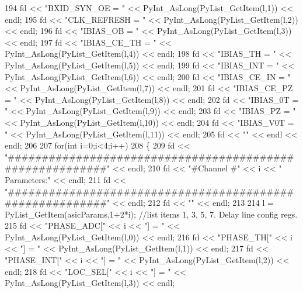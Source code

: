\begin{DoxyCode}
{{194         fd <<   \textcolor{stringliteral}{"BXID\_SYN\_OE = "} << PyInt\_AsLong(PyList\_GetItem(l,1)) << endl;
195         fd <<   \textcolor{stringliteral}{"CLK\_REFRESH = "} << PyInt\_AsLong(PyList\_GetItem(l,2)) << endl;
196         fd <<   \textcolor{stringliteral}{"IBIAS\_OB    = "} << PyInt\_AsLong(PyList\_GetItem(l,3)) << endl;
197         fd <<   \textcolor{stringliteral}{"IBIAS\_CE\_TH = "} << PyInt\_AsLong(PyList\_GetItem(l,4)) << endl;
198         fd <<   \textcolor{stringliteral}{"IBIAS\_TH    = "} << PyInt\_AsLong(PyList\_GetItem(l,5)) << endl;
199         fd <<   \textcolor{stringliteral}{"IBIAS\_INT   = "} << PyInt\_AsLong(PyList\_GetItem(l,6)) << endl;
200         fd <<   \textcolor{stringliteral}{"IBIAS\_CE\_IN = "} << PyInt\_AsLong(PyList\_GetItem(l,7)) << endl;
201         fd <<   \textcolor{stringliteral}{"IBIAS\_CE\_PZ = "} << PyInt\_AsLong(PyList\_GetItem(l,8)) << endl;  
202         fd <<   \textcolor{stringliteral}{"IBIAS\_0T    = "} << PyInt\_AsLong(PyList\_GetItem(l,9)) << endl;
203         fd <<   \textcolor{stringliteral}{"IBIAS\_PZ    = "} << PyInt\_AsLong(PyList\_GetItem(l,10)) << endl;
204         fd <<   \textcolor{stringliteral}{"IBIAS\_V0T   = "} << PyInt\_AsLong(PyList\_GetItem(l,11)) << endl;
205         fd << \textcolor{stringliteral}{""} << endl << endl;
206 
207         \textcolor{keywordflow}{for}(\textcolor{keywordtype}{int} i=0;i<4;i++)
208         \{
209             fd << \textcolor{stringliteral}{"#########################################################"} << endl;
210             fd << \textcolor{stringliteral}{"#Channel #"} << i << \textcolor{stringliteral}{" Parameters:"} << endl;
211             fd << \textcolor{stringliteral}{"#########################################################"} << endl;
212             fd << \textcolor{stringliteral}{""} << endl;
213 
214             l = PyList\_GetItem(asicParams,1+2*i);       \textcolor{comment}{//list items 1, 3, 5, 7. Delay line config regs.}
215             fd <<   \textcolor{stringliteral}{"PHASE\_ADC["} << i << \textcolor{stringliteral}{"]   = "} << PyInt\_AsLong(PyList\_GetItem(l,0)) << endl;
216             fd <<   \textcolor{stringliteral}{"PHASE\_TH["} << i << \textcolor{stringliteral}{"]    = "} << PyInt\_AsLong(PyList\_GetItem(l,1)) << endl;
217             fd <<   \textcolor{stringliteral}{"PHASE\_INT["} << i << \textcolor{stringliteral}{"]   = "} << PyInt\_AsLong(PyList\_GetItem(l,2)) << endl;
218             fd <<   \textcolor{stringliteral}{"LOC\_SEL["} << i << \textcolor{stringliteral}{"]     = "} << PyInt\_AsLong(PyList\_GetItem(l,3)) << endl;
}}
\end{DoxyCode}
